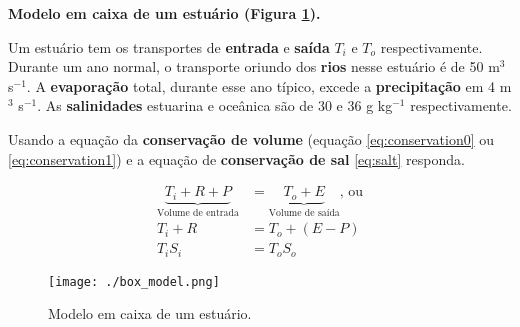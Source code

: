 \question
{\bf Modelo em caixa de um estuário (Figura \ref{fig:box}).}

Um estuário tem os transportes de {\bf entrada} e {\bf saída} $T_i$ e $T_o$
respectivamente.  Durante um ano normal, o transporte oriundo dos {\bf rios}
nesse estuário é de 50 m$^3$ s$^{-1}$.  A {\bf evaporação} total, durante esse
ano típico, excede a {\bf precipitação} em 4 m$^3$ s$^{-1}$.  As {\bf salinidades}
estuarina e oceânica são de 30 e 36 g kg$^{-1}$ respectivamente.

Usando a equação da {\bf conservação de volume} (equação \ref{eq:conservation0} ou \ref{eq:conservation1}) e a equação de {\bf conservação de sal} \ref{eq:salt}
responda.

\begin{align}
  \underbrace{T_i + R + P}_{\text{Volume de entrada}} &= \underbrace{T_o + E}_{\text{Volume de saída}} \text{, ou} \label{eq:conservation0}\\
  T_i + R &= T_o + (E-P) \label{eq:conservation1}\\
  T_iS_i &= T_oS_o \label{eq:salt}
\end{align}

\begin{figure}[ht]
  \centering
  \texttt{[image: ./box\_model.png]}
  \caption{Modelo em caixa de um estuário.}
  \label{fig:box}
\end{figure}

